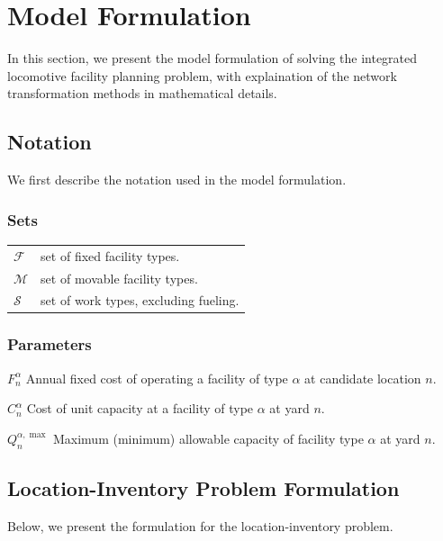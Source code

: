 \section{Model Formulation}\label{sec:locomotive:formulation}

In this section, we present the model formulation of solving the integrated locomotive facility planning problem, with explaination of the network transformation methods in mathematical details.


\subsection{Notation}\label{sec:locomotive:notation}
We first describe the notation used in the model formulation.

\subsubsection{Sets}
\begin{tabular}{ll}
    $\mathcal{F}$            & set of fixed facility types.  \\
    $\mathcal{M}$            & set of movable facility types.  \\
    $\mathcal{S}$            & set of work types, excluding fueling.  \\
\end{tabular}

\subsubsection{Parameters}
\begin{notation}
  \item[$F_{n}^{\alpha}$] Annual fixed cost of operating a facility of type $\alpha$ at candidate location $n$.
  \item[$C_{n}^{\alpha}$] Cost of unit capacity at a facility of type $\alpha$ at yard $n$.
  \item[$Q_{n}^{\alpha,\max}$] Maximum (minimum) allowable capacity of facility type $\alpha$ at yard $n$.
\end{notation}


\subsection{Location-Inventory Problem Formulation}\label{sec:locomotive:location-inventory}
Below, we present the formulation for the location-inventory problem.


